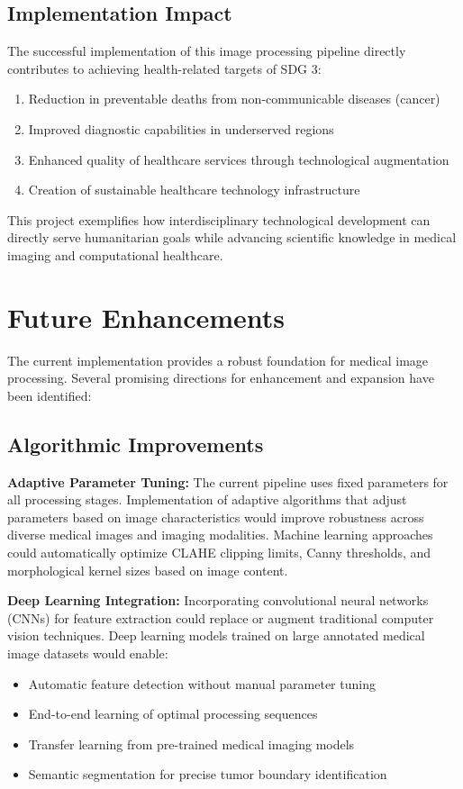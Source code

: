 \documentclass[12pt,a4paper]{article}
\begin{document}
\subsection{Implementation Impact}

The successful implementation of this image processing pipeline directly contributes to achieving health-related targets of SDG 3:
\begin{enumerate}
    \item Reduction in preventable deaths from non-communicable diseases (cancer)
    \item Improved diagnostic capabilities in underserved regions
    \item Enhanced quality of healthcare services through technological augmentation
    \item Creation of sustainable healthcare technology infrastructure
\end{enumerate}

This project exemplifies how interdisciplinary technological development can directly serve humanitarian goals while advancing scientific knowledge in medical imaging and computational healthcare.

\newpage

\section{Future Enhancements}

The current implementation provides a robust foundation for medical image processing. Several promising directions for enhancement and expansion have been identified:

\subsection{Algorithmic Improvements}

\textbf{Adaptive Parameter Tuning:} The current pipeline uses fixed parameters for all processing stages. Implementation of adaptive algorithms that adjust parameters based on image characteristics would improve robustness across diverse medical images and imaging modalities. Machine learning approaches could automatically optimize CLAHE clipping limits, Canny thresholds, and morphological kernel sizes based on image content.

\textbf{Deep Learning Integration:} Incorporating convolutional neural networks (CNNs) for feature extraction could replace or augment traditional computer vision techniques. Deep learning models trained on large annotated medical image datasets would enable:
\begin{itemize}
    \item Automatic feature detection without manual parameter tuning
    \item End-to-end learning of optimal processing sequences
    \item Transfer learning from pre-trained medical imaging models
    \item Semantic segmentation for precise tumor boundary identification
\end{itemize}
\end{document}
